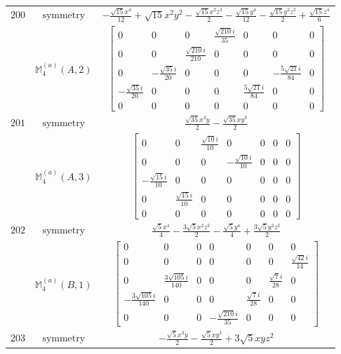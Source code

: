 \documentclass[fleqn,8pt,landscape]{jsarticle}
\begin{document}
\begin{longtable}{ccc}
$ 200 $ & $ \text{symmetry} $ & $ - \frac{\sqrt{15} x^{4}}{12} + \sqrt{15} x^{2} y^{2} - \frac{\sqrt{15} x^{2} z^{2}}{2} - \frac{\sqrt{15} y^{4}}{12} - \frac{\sqrt{15} y^{2} z^{2}}{2} + \frac{\sqrt{15} z^{4}}{6} $ \\
$  $ & $ \mathbb{M}_{4}^{(a)}(A,2) $ & $ \begin{bmatrix} 0 & 0 & 0 & \frac{\sqrt{210} i}{35} & 0 & 0 & 0 \\ 0 & 0 & \frac{\sqrt{210} i}{210} & 0 & 0 & 0 & 0 \\ 0 & - \frac{\sqrt{35} i}{20} & 0 & 0 & 0 & - \frac{5 \sqrt{21} i}{84} & 0 \\ - \frac{\sqrt{35} i}{20} & 0 & 0 & 0 & \frac{5 \sqrt{21} i}{84} & 0 & 0 \\ 0 & 0 & 0 & 0 & 0 & 0 & 0 \end{bmatrix} $ \\ \hline
$ 201 $ & $ \text{symmetry} $ & $ \frac{\sqrt{35} x^{3} y}{2} - \frac{\sqrt{35} x y^{3}}{2} $ \\
$  $ & $ \mathbb{M}_{4}^{(a)}(A,3) $ & $ \begin{bmatrix} 0 & 0 & \frac{\sqrt{10} i}{10} & 0 & 0 & 0 & 0 \\ 0 & 0 & 0 & - \frac{\sqrt{10} i}{10} & 0 & 0 & 0 \\ - \frac{\sqrt{15} i}{10} & 0 & 0 & 0 & 0 & 0 & 0 \\ 0 & \frac{\sqrt{15} i}{10} & 0 & 0 & 0 & 0 & 0 \\ 0 & 0 & 0 & 0 & 0 & 0 & 0 \end{bmatrix} $ \\ \hline
$ 202 $ & $ \text{symmetry} $ & $ \frac{\sqrt{5} x^{4}}{4} - \frac{3 \sqrt{5} x^{2} z^{2}}{2} - \frac{\sqrt{5} y^{4}}{4} + \frac{3 \sqrt{5} y^{2} z^{2}}{2} $ \\
$  $ & $ \mathbb{M}_{4}^{(a)}(B,1) $ & $ \begin{bmatrix} 0 & 0 & 0 & 0 & 0 & 0 & 0 \\ 0 & 0 & 0 & 0 & 0 & 0 & \frac{\sqrt{42} i}{14} \\ 0 & \frac{3 \sqrt{105} i}{140} & 0 & 0 & 0 & \frac{\sqrt{7} i}{28} & 0 \\ - \frac{3 \sqrt{105} i}{140} & 0 & 0 & 0 & \frac{\sqrt{7} i}{28} & 0 & 0 \\ 0 & 0 & 0 & - \frac{\sqrt{210} i}{35} & 0 & 0 & 0 \end{bmatrix} $ \\ \hline
$ 203 $ & $ \text{symmetry} $ & $ - \frac{\sqrt{5} x^{3} y}{2} - \frac{\sqrt{5} x y^{3}}{2} + 3 \sqrt{5} x y z^{2} $ \\

\end{longtable}
\end{document}
